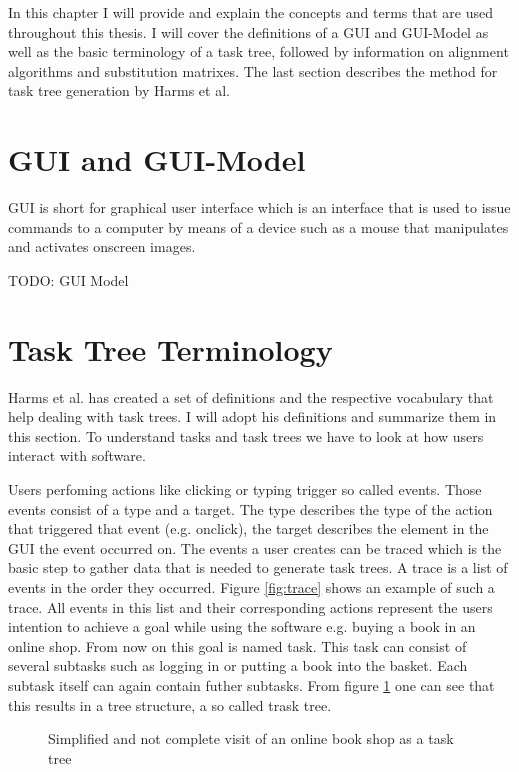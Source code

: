 In this chapter I will provide and explain the concepts and terms that are used throughout this thesis. 
I will cover the definitions of a GUI and GUI-Model as well as the basic terminology of a task tree, followed by 
 information on alignment algorithms and substitution matrixes.
The last section describes the method for task tree generation by Harms et al.\cite{harms2013}


\section{GUI and GUI-Model}
\label{sec:foundationguiandguimodel}
GUI is short for graphical user interface which is an interface that is used to issue commands to a computer by means of a device such as a mouse that manipulates and activates onscreen images.\cite{Dictionary.com2014}

TODO: GUI Model

\section{Task Tree Terminology}
\label{sec:foundationtasktreeterminology}
Harms et al.\cite{harms2013} has created a set of definitions and the respective vocabulary that help dealing with task trees.
I will adopt his definitions and summarize them in this section.
To understand tasks and task trees we have to look at how users interact with software. 

Users perfoming actions like clicking or typing trigger so called events. Those events consist of a type and a target. 
The type describes the type of the action that triggered that event (e.g. onclick), the target describes the element in the GUI the event occurred on.
The events a user creates can be traced which is the basic step to gather data that is needed to generate task trees. 
A trace is a list of events in the order they occurred. Figure \ref{fig:trace} shows an example of such a trace. 
All events in this list and their corresponding actions represent the users intention to achieve a goal while using the software e.g. buying a book 
in an online shop. From now on this goal is named task. This task can consist of several subtasks such as logging in or putting a book into the basket.
Each subtask itself can again contain futher subtasks. From figure \ref{fig:booktree} one can see that this results in a tree structure, a so called trask tree.

\begin{figure}
	\label{fig:booktree}
	\caption{Simplified and not complete visit of an online book shop as a task tree}
\end{figure}

